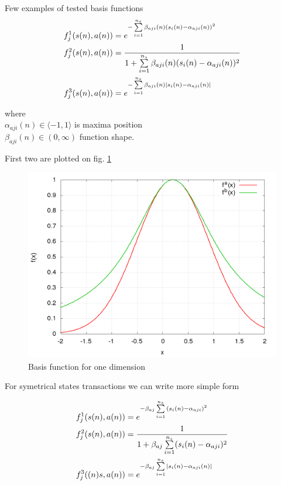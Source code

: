 \documentclass{acmbulletin}
\begin{document}
Few examples of tested basis functions
\begin{align}
    f_j^1(\boldmath{s(n), a(n)}) &= e^{ -\sum\limits_{i=1}^{n_s}{\beta_{aji}(n)(s_i(n) - \alpha_{aji}(n))^2} }  \\
    f_j^2(\boldmath{s(n), a(n)}) &= \frac{1}{1 + \sum\limits_{i=1}^{n_s}{\beta_{aji}(n)(s_i(n) - \alpha_{aji}(n))^2}}  \\
    f_j^3(\boldmath{s(n), a(n)}) &= e^{ -\sum\limits_{i=1}^{n_s}{\beta_{aji}(n)\mid s_i(n) - \alpha_{aji}(n) \mid} }
    \label{eq:basis_functions_01}
\end{align}

where \\
$\alpha_{aji}(n) \in \langle -1, 1 \rangle$ is maxima position \\
$\beta_{aji}(n) \in (0, \infty)$ function shape.

First two are plotted on fig. \ref{img:basis_funcions}

\begin{figure}[]
\center
\includegraphics[scale=.3]{../pictures/gaussian_1D.png}
\caption{Basis function for one dimension}
\label{img:basis_funcions}
\end{figure}

For symetrical states transactions we can write more simple form

\begin{align}
f_j^1(\boldmath{s(n), a(n)}) &= e^{ -\beta_{aj} \sum\limits_{i=1}^{n_s}{(s_i(n) - \alpha_{aji})^2} }  \\
f_j^2(\boldmath{s(n), a(n)}) &= \frac{1}{1 + {\beta_{aj} \sum\limits_{i=1}^{n_s}(s_i(n) - \alpha_{aji})^2}}  \\
f_j^3(\boldmath{(n)s, a(n)}) &= e^{ -\beta_{aj} \sum\limits_{i=1}^{n_s}{\mid s_i(n) - \alpha_{aji}(n) \mid} }
\label{eq:basis_functions}
\end{align}
\end{document}
